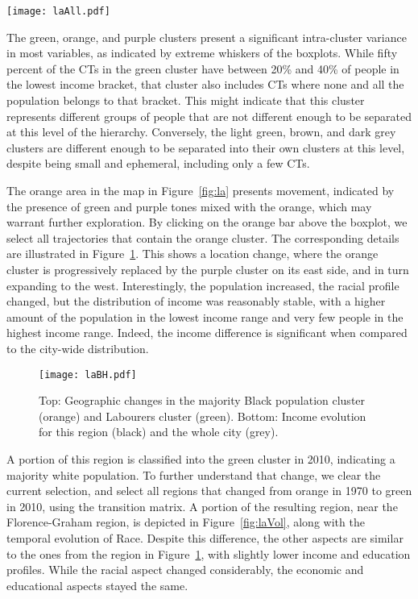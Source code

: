 \begin{figure*}
    \centering 
    \texttt{[image: laAll.pdf]}
    \caption{Full characterisation of the eight clusters found for LA. The red
     rectangles indicate the most relevant aspects for each
     cluster.\label{fig:laAll}}
\end{figure*}

The  green, orange, and purple clusters present a significant intra-cluster
variance in most variables, as indicated by extreme whiskers of the boxplots.
While fifty percent of the CTs in the green cluster have between 20\% and 40\%
of people in the lowest income bracket, that cluster also includes CTs where
none and all the population belongs to that bracket. This might indicate that
this cluster represents different groups of people that are not different enough
to be separated at this level of the hierarchy. Conversely, the light green,
brown, and dark grey clusters are different enough to be separated into their
own clusters at this level, despite being small and ephemeral, including only a
few CTs. 

The orange area in the map in Figure~\ref{fig:la} presents movement, indicated by
the presence of green and purple tones mixed with the orange, which may warrant
further exploration. By clicking on the orange bar above the boxplot, we select
all trajectories that contain the orange cluster. The corresponding details are
illustrated in Figure~\ref{fig:labh}. This shows a location change, where the
orange cluster is progressively replaced by the purple cluster on its east side,
and in turn expanding to the west. Interestingly, the population increased, the
racial profile changed, but the distribution of income was reasonably stable,
with a higher amount of the population in the lowest income range and very few
people in the highest income range. Indeed, the income  difference is
significant when compared to the city-wide distribution.

\begin{figure}
    \centering 
    \texttt{[image: laBH.pdf]}
    \caption{Top: Geographic changes in the majority Black population cluster
    (orange) and Labourers cluster (green). Bottom: Income evolution for this
    region (black) and the whole city (grey).\label{fig:labh}}
\end{figure}


A portion of this region is classified into the green cluster in 2010,
indicating a majority white population. To further understand that change, we
clear the current selection, and select all regions that changed from orange in
1970 to green in 2010, using the transition matrix. A portion of the resulting
region, near the Florence-Graham region, is depicted in Figure~\ref{fig:laVol},
along with the temporal evolution of Race. Despite this difference, the other
aspects are similar to the ones from the region in Figure~\ref{fig:labh}, with
slightly lower income and education profiles. While the racial aspect changed
considerably, the economic and educational aspects stayed the same.

